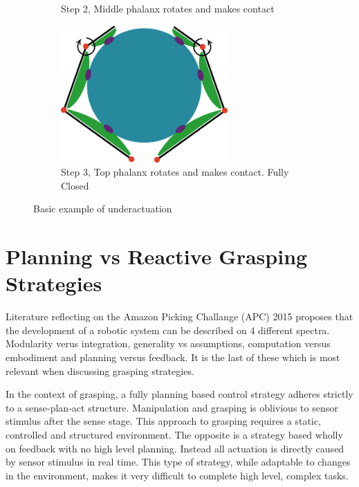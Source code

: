\begin{figure}
\begin{subfigure}{.45\linewidth}
\caption{Step 2, Middle phalanx rotates and makes contact}
        \label{fig:UAStep2}
    \end{subfigure}
    \begin{subfigure}{.45\linewidth}
        \centering
        \includegraphics[width=0.7\textwidth]{Images/Underactuaction/FullyClosed.png}
\caption{Step 3, Top phalanx rotates and makes contact. Fully Closed}
        \label{fig:UAStep3}
    \end{subfigure}
    \caption{Basic example of underactuation}
    \label{fig:UnderActucation}
\end{figure}




\section{Planning vs Reactive Grasping Strategies}

Literature reflecting on the Amazon Picking Challange (APC) 2015 \cite{Eppner2018} proposes that the development of a robotic system can be described on 4 different spectra. Modularity verus integration, generality vs assumptions, computation versus embodiment and planning versus feedback. It is the last of these which is most relevant when discussing grasping strategies.

In the context of grasping, a fully planning based control strategy adheres strictly to a sense-plan-act structure. Manipulation and grasping is oblivious to sensor stimulus after the sense stage. This approach to grasping requires a static, controlled and structured environment. The opposite is a strategy based wholly on feedback with no high level planning. Instead all actuation is directly caused by sensor stimulus in real time. This type of strategy, while adaptable to changes in the environment, makes it very difficult to complete high level, complex tasks.

